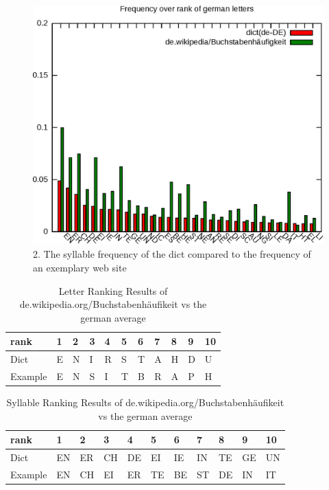 \begin{frame}[c]

\begin{figure}[htp]
\begin{center}
  \includegraphics[width=1\textheight]{graphics/syllables_de}
  \caption[fig:letters_de]{2. The syllable frequency of the dict compared to the
  frequency of an exemplary web site}
  \label{fig:syllablefreq}
\end{center}
\end{figure}
\end{frame}

\begin{frame}[c]
\begin{table}
\begin{tabular}{|lllllllllll|}
\hline
rank&1&2&3&4&5&6&7&8&9&10\\
\hline
Dict&E&N&I&R&S&T&A&H&D&U\\
Example&E&N&S&I&T&B&R&A&P&H\\
\hline
\end{tabular}
\caption{Letter Ranking Results of de.wikipedia.org/Buchstabenhäufikeit vs the
german average}
\label{tbl:letterRank}
\end{table}

\begin{table}
\begin{tabular}{|lllllllllll|}
\hline
rank&1&2&3&4&5&6&7&8&9&10\\
\hline
Dict&EN&ER&CH&DE&EI&IE&IN&TE&GE&UN\\
Example&EN&CH&EI&ER&TE&BE&ST&DE&IN&IT\\
\hline
\end{tabular}
\caption{Syllable Ranking Results of de.wikipedia.org/Buchstabenhäufikeit vs the
german average}
\label{tbl:syllableRank}
\end{table}
\end{frame}
 
